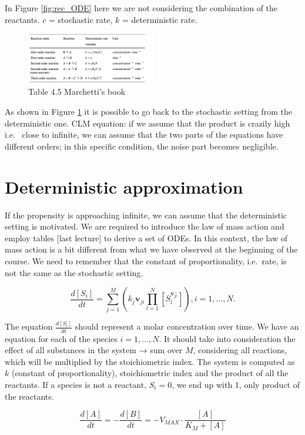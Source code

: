\noindent
In Figure \ref{fig:rec_ODE} here we are not considering the combination of the reactants.
$c$ = stochastic rate, $k$ = deterministic rate.

\begin{figure}
  \centering
  \includegraphics[width=0.5\textwidth]{reaction_rates.png}
  \caption{Table 4.5 Marchetti's book}
  \label{fig:rec_rates}
\end{figure}

\noindent
As shown in Figure \ref{fig:rec_rates} it is possible to go back to the stochastic setting from the deterministic one.
CLM equation: if we assume that the product is crazily high i.e. ~close to infinite, we can assume that the two parts of the equations have different orders; in this specific condition, the noise part becomes negligible.

\section{Deterministic approximation}
If the propensity is approaching infinite, we can assume that the deterministic setting is motivated.
We are required to introduce the law of mass action and employ tables {[}last lecture{]} to derive a set of ODEs.
In this context, the law of mass action is a bit different from what we have observed at the beginning of the course.
We need to remember that the constant of proportionality, i.e.~rate, is not the same as the stochastic setting.

$$ \frac{d[S_i]}{dt}= \sum^M_{j=1}( k_j\mathbf{v}_{ji}\prod^{N}_{l=1}{[S_l^{\mathbf{v}^{-}_{jl}}]}) ,i = 1,...,N.$$

\noindent
The equation $\frac{d[S_i]}{dt}$ should represent a molar concentration over time.
We have an equation for each of the species $i=1,…,N$.
It should take into consideration the effect of all substances in the system → sum over $M$, considering all reactions, which will be multiplied by the stoichiometric index.
The system is computed as $k$ (constant of proportionality), stoichiometric index and the product of all the reactants.
If a species is not a reactant, $S_i=0$, we end up with 1, only product of the reactants.

$$\frac{d[A]}{dt}= - \frac{d[B]}{dt}= -V_{MAX}\cdot \frac{[A]}{K_M+[A]}$$

